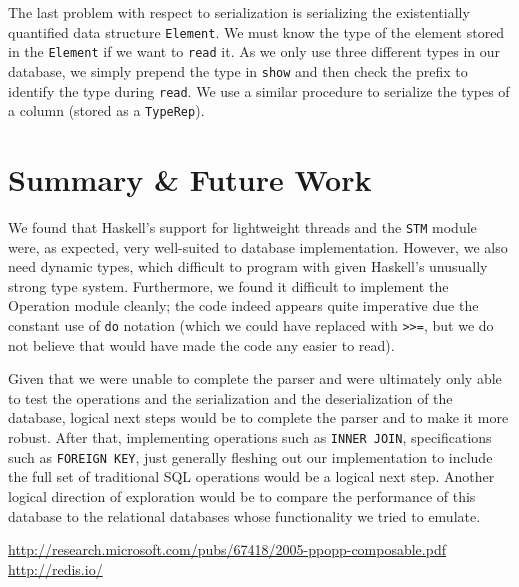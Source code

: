 \documentclass[10pt]{article}
\begin{document}
\begin{multicols}{2}
The last problem with respect to serialization is serializing the existentially quantified data structure \texttt{Element}. We must know the type of the element stored in the \texttt{Element} if we want to \texttt{read} it. As we only use three different types in our database, we simply prepend the type in \texttt{show} and then check the prefix to identify the type during \texttt{read}. We use a similar procedure to serialize the types of a column (stored as a \texttt{TypeRep}).

\section{Summary \& Future Work}
We found that Haskell's support for lightweight threads and the \texttt{STM} module were, as expected, very well-suited to database implementation. However, we also need dynamic types, which difficult to program with given Haskell's unusually strong type system. Furthermore, we found it difficult to implement the Operation module cleanly; the code indeed appears quite imperative due the constant use of \texttt{do} notation (which we could have replaced with \texttt{>>=}, but we do not believe that would have made the code any easier to read). 

Given that we were unable to complete the parser and were ultimately only able to test the operations and the serialization and the deserialization of the database, logical next steps would be to complete the parser and to make it more robust. After that, implementing operations such as \texttt{INNER JOIN}, specifications such as \texttt{FOREIGN KEY}, just generally fleshing out our implementation to include the full set of traditional SQL operations would be a logical next step. Another logical direction of exploration would be to compare the performance of this database to the relational databases whose functionality we tried to emulate.

\end{multicols}

\begin{thebibliography}{1}

 \url{http://research.microsoft.com/pubs/67418/2005-ppopp-composable.pdf}
 \url{http://redis.io/}

\end{thebibliography}
\end{document}
